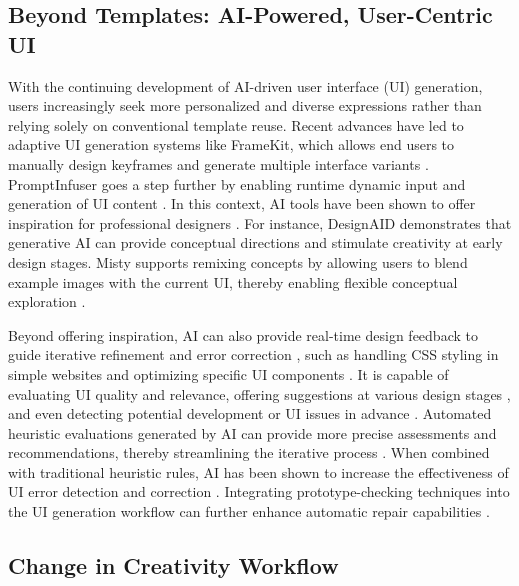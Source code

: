 \subsection{Beyond Templates: AI-Powered, User-Centric UI}

With the continuing development of AI-driven user interface (UI) generation, users increasingly seek more personalized and diverse expressions rather than relying solely on conventional template reuse. Recent advances have led to adaptive UI generation systems like FrameKit, which allows end users to manually design keyframes and generate multiple interface variants \cite{wu_framekit_2024}. PromptInfuser goes a step further by enabling runtime dynamic input and generation of UI content \cite{petridisPromptInfuserHowTightly2024}. In this context, AI tools have been shown to offer inspiration for professional designers \cite{luBridgingGapUX2022}. For instance, DesignAID \cite{cai_designaid_2023} demonstrates that generative AI can provide conceptual directions and stimulate creativity at early design stages. Misty supports remixing concepts by allowing users to blend example images with the current UI, thereby enabling flexible conceptual exploration \cite{luMistyUIPrototyping2024}.

Beyond offering inspiration, AI can also provide real-time design feedback to guide iterative refinement and error correction \cite{duan_towards_2023}, such as handling CSS styling in simple websites and optimizing specific UI components \cite{liUsingLLMsCustomize2023}. It is capable of evaluating UI quality and relevance, offering suggestions at various design stages \cite{wuUIClipDatadrivenModel2024}, and even detecting potential development or UI issues in advance \cite{petridisPromptInfuserHowTightly2024}. Automated heuristic evaluations generated by AI can provide more precise assessments and recommendations, thereby streamlining the iterative process \cite{duanGeneratingAutomaticFeedback2024}. When combined with traditional heuristic rules, AI has been shown to increase the effectiveness of UI error detection and correction \cite{lu_ai_2024}. Integrating prototype-checking techniques into the UI generation workflow can further enhance automatic repair capabilities \cite{xiaoPrototype2CodeEndtoendFrontend2024}.

\subsection{Change in Creativity Workflow}

